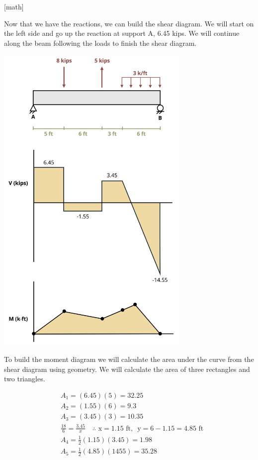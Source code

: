 \documentclass[
  letterpaper,
  DIV=11,
  numbers=noendperiod]{scrreprt}
\begin{document}
\begin{tcolorbox}
{[}math{]}

Now that we have the reactions, we can build the shear diagram. We will
start on the left side and go up the reaction at support A, 6.45 kips.
We will continue along the beam following the loads to finish the shear
diagram.

\begin{center}
\includegraphics[width=3.66667in,height=\textheight]{images/CH9 PNGs/Example 9.3 part 3.png}
\end{center}

To build the moment diagram we will calculate the area under the curve
from the shear diagram using geometry. We will calculate the area of
three rectangles and two triangles.

\[
\begin{aligned}
& A_1=(6.45)(5)=32.25 \\
& A_2=(1.55)(6)=9.3 \\
& A_3=(3.45)(3)=10.35 \\
& \frac{18}{6}=\frac{3.45}{x} \quad \therefore \text{ x}=1.15 \text{ ft, } \text{ y}=6-1.15=4.85 \text{ ft} \\
& A_4=\frac{1}{2}(1.15)(3.45)=1.98 \\
& A_5=\frac{1}{2}(4.85)(1455)=35.28 \\
&
\end{aligned}
\]


\end{tcolorbox}
\end{document}
